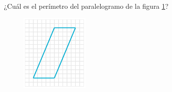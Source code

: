 
\question[25]  ¿Cuál es el perímetro del paralelogramo de la figura \ref{fig:peri_paralelogramo_03}?
\begin{figure}[H]
    \begin{center}
        \includegraphics[width=0.3\textwidth]{../images/peri_paralelogramo_03.png}
    \end{center}
    \caption{}
    \label{fig:peri_paralelogramo_03}
\end{figure}